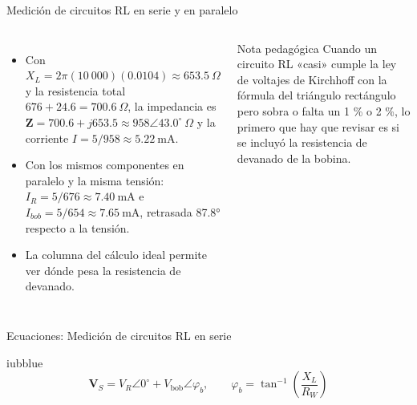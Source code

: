\documentclass[aspectratio=169,11pt,xcolor={table}]{beamer}
\begin{document}
\begin{frame}{Medición de circuitos RL en serie y en paralelo}
\begin{columns}[c,onlytextwidth]
\small
\begin{itemize}\setlength{\itemsep}{4pt}
  \item Con $X_L = 2\pi(10\ 000)(0.0104) \approx 653.5\ \Omega$ y la resistencia total $676 + 24.6 = 700.6\ \Omega$, la impedancia es $\mathbf{Z} = 700.6 + j653.5 \approx 958 \angle 43.0^\circ\ \Omega$ y la corriente $I = 5/958 \approx 5.22\ \text{mA}$.
  \item Con los mismos componentes en paralelo y la misma tensión: $I_R = 5/676 \approx 7.40\ \text{mA}$ e $I_{bob} = 5/654 \approx 7.65\ \text{mA}$, retrasada 87.8° respecto a la tensión.
  \item La columna del cálculo ideal permite ver dónde pesa la resistencia de devanado.
\end{itemize}
\begin{cardO}{Nota pedagógica}
\footnotesize Cuando un circuito RL «casi» cumple la ley de voltajes de Kirchhoff con la fórmula del triángulo rectángulo pero sobra o falta un 1 \% o 2 \%, lo primero que hay que revisar es si se incluyó la resistencia de devanado de la bobina.
\end{cardO}
\end{columns}
\end{frame}

\begin{frame}{Ecuaciones: Medición de circuitos RL en serie}
\begin{cajaplana}{iubblue}
\centering
{\large
\begin{equation*}
  \mathbf{V}_S = V_R\angle 0^\circ + V_{\mathrm{bob}}\angle \varphi_b, \qquad \varphi_b = \tan^{-1}\!\left(\frac{X_L}{R_W}\right)
\end{equation*}
}
\end{cajaplana}
\end{frame}
\end{document}
